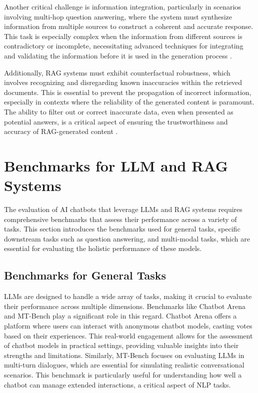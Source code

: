 Another critical challenge is information integration, particularly in scenarios involving multi-hop question answering, where the system must synthesize information from multiple sources to construct a coherent and accurate response. This task is especially complex when the information from different sources is contradictory or incomplete, necessitating advanced techniques for integrating and validating the information before it is used in the generation process \cite{luo2023divide}.

Additionally, RAG systems must exhibit counterfactual robustness, which involves recognizing and disregarding known inaccuracies within the retrieved documents. This is essential to prevent the propagation of incorrect information, especially in contexts where the reliability of the generated content is paramount. The ability to filter out or correct inaccurate data, even when presented as potential answers, is a critical aspect of ensuring the trustworthiness and accuracy of RAG-generated content \cite{lewis2020retrieval}.

\section{Benchmarks for LLM and RAG Systems}

The evaluation of AI chatbots that leverage LLMs and RAG systems requires comprehensive benchmarks that assess their performance across a variety of tasks. This section introduces the benchmarks used for general tasks, specific downstream tasks such as question answering, and multi-modal tasks, which are essential for evaluating the holistic performance of these models.

\subsection{Benchmarks for General Tasks}

LLMs are designed to handle a wide array of tasks, making it crucial to evaluate their performance across multiple dimensions. Benchmarks like Chatbot Arena \cite{lmsys2024arena} and MT-Bench \cite{zheng2024judging} play a significant role in this regard. Chatbot Arena offers a platform where users can interact with anonymous chatbot models, casting votes based on their experiences. This real-world engagement allows for the assessment of chatbot models in practical settings, providing valuable insights into their strengths and limitations. Similarly, MT-Bench focuses on evaluating LLMs in multi-turn dialogues, which are essential for simulating realistic conversational scenarios. This benchmark is particularly useful for understanding how well a chatbot can manage extended interactions, a critical aspect of NLP tasks.

